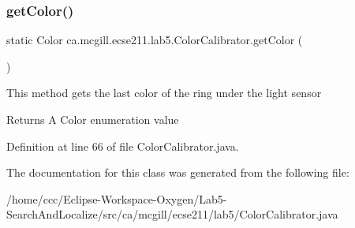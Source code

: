 \subsubsection{\texorpdfstring{get\+Color()}{getColor()}\hspace{0.1cm}{\footnotesize\ttfamily [2/2]}}
{\footnotesize\ttfamily static Color ca.\+mcgill.\+ecse211.\+lab5.\+Color\+Calibrator.\+get\+Color (\begin{DoxyParamCaption}{ }\end{DoxyParamCaption})\hspace{0.3cm}{\ttfamily [static]}}

This method gets the last color of the ring under the light sensor

\begin{DoxyReturn}{Returns}
A Color enumeration value 
\end{DoxyReturn}


Definition at line 66 of file Color\+Calibrator.\+java.



The documentation for this class was generated from the following file\+:\begin{DoxyCompactItemize}
\item 
/home/ccc/\+Eclipse-\/\+Workspace-\/\+Oxygen/\+Lab5-\/\+Search\+And\+Localize/src/ca/mcgill/ecse211/lab5/Color\+Calibrator.\+java\end{DoxyCompactItemize}
